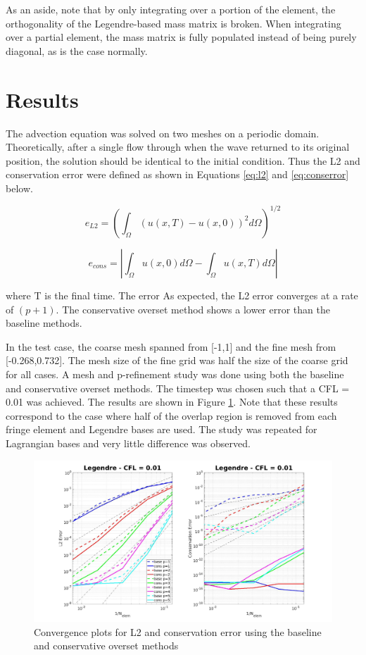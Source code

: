 \documentclass[11pt]{article}
\begin{document}
As an aside, note that by only integrating over a portion of the element, the orthogonality of the
Legendre-based mass matrix is broken. When integrating over a partial element, the mass
matrix is fully populated instead of being purely diagonal, as is the case normally. 

\section{Results}

The advection equation was solved on two meshes on a periodic domain. 
Theoretically, after a single flow through when the wave 
returned to its original position, the solution should 
be identical to the initial condition. Thus the L2 and conservation error were defined as 
shown in Equations \eqref{eq:l2} and \eqref{eq:conserror} below. 

\begin{equation}
e_{L2} = \left ( \int_\Omega (u(x,T) - u(x,0))^2 d\Omega \right )^{1/2}
\label{eq:l2}
\end{equation}

\begin{equation}
e_{cons} = \left | \int_\Omega u(x,0) d\Omega - \int_\Omega u(x,T) d\Omega \right |
\label{eq:conserror}
\end{equation}

\noindent where T is the final time.  The error 
As expected, the L2 error converges at a rate of $(p+1)$. The conservative overset method
shows a lower error than the baseline methods. 

In the test case, the coarse
mesh spanned from [-1,1] and the fine mesh from [-0.268,0.732]. The mesh size of the 
fine grid was half the size of the coarse grid for all cases. A mesh and p-refinement
study was done using both the baseline and conservative overset methods. The timestep
was chosen such that a CFL = 0.01 was achieved. The
results are shown in Figure \ref{fig:error1}. Note that 
these results correspond to the case where half of the overlap region is removed from
each fringe element and Legendre bases are used. The study was repeated for Lagrangian
bases and very little difference was observed.  


\begin{figure}
\centering
  \includegraphics[width=\textwidth]{Figures/Convergence_Legendre_CFL0p01.jpg}
  \caption{Convergence plots for L2 and conservation error using the baseline and conservative overset methods}
  \label{fig:error1}
\end{figure}
\end{document}
